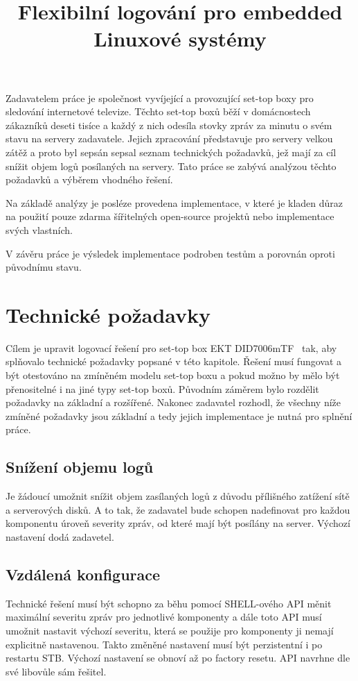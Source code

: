 \documentclass[thesis=B,czech]{FITthesis}[2012/06/26]
\title{Flexibilní logování pro embedded Linuxové systémy}
\begin{document}
\begin{introduction}
Zadavatelem práce je společnost vyvíjející a provozující set-top boxy pro sledování internetové televize.
Těchto set-top boxů běží v domácnostech zákazníků deseti tisíce a každý z nich odesíla stovky zpráv za minutu o svém stavu na servery zadavatele. Jejich zpracování představuje pro servery velkou zátěž a proto byl sepsán sepsal seznam technických požadavků, jež mají za cíl snížit objem logů posílaných na servery.
Tato práce se zabývá analýzou těchto požadavků a výběrem vhodného řešení.
 
Na základě analýzy je posléze provedena implementace, v které je kladen důraz na použití pouze zdarma šířitelných open-source projektů nebo implementace svých vlastních.
 
V závěru práce je výsledek implementace podroben testům a porovnán oproti původnímu stavu.
\end{introduction}

\chapter{Technické požadavky}
Cílem je upravit logovací řešení pro set-top box EKT DID7006mTF~\cite{ekt7006} tak, aby splňovalo technické požadavky popsané v této kapitole. Řešení musí fungovat a být otestováno na zmíněném modelu set-top boxu a pokud možno by mělo být přenositelné i na jiné typy set-top boxů.
Původním záměrem bylo rozdělit požadavky na základní a rozšířené. Nakonec zadavatel rozhodl, že všechny níže zmíněné požadavky jsou základní a tedy jejich implementace je nutná pro splnění práce.

\section*{Snížení objemu logů}
Je žádoucí umožnit snížit objem zasílaných logů z důvodu přílišného zatížení sítě a serverových disků. A to tak, že zadavatel bude schopen nadefinovat pro každou komponentu úroveň severity zpráv, od které mají být posílány na server. Výchozí nastavení dodá zadavetel.

\section*{Vzdálená konfigurace}
Technické řešení musí být schopno za běhu pomocí SHELL-ového API měnit maximální severitu zpráv pro jednotlivé komponenty a dále toto API musí umožnit nastavit výchozí severitu, která se použije pro komponenty ji nemají explicitně nastavenou. Takto změněné nastavení musí být perzistentní i po restartu STB. Výchozí nastavení se obnoví až po factory resetu. API navrhne dle své libovůle sám řešitel.
\end{document}
